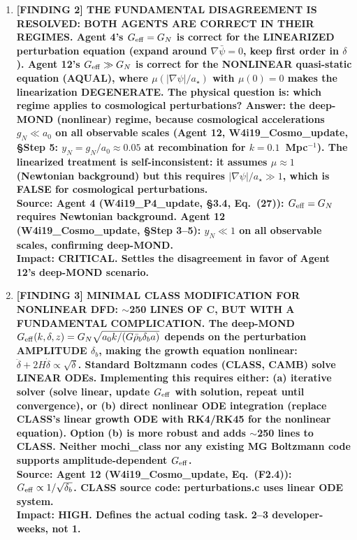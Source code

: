 \documentclass[11pt]{article}
\theoremstyle{definition}
\theoremstyle{remark}
\newcommand{\Geff}{G_{\rm eff}}
\newcommand{\astar}{a_\star}
\begin{document}
\begin{tcolorbox}[colback=blue!5!white, colframe=blue!60!black,
  title=\textbf{W4i20 TOP 5 FINDINGS --- RANKED BY IMPACT}]
\begin{enumerate}[nosep]
\item \textbf{[FINDING 2] THE FUNDAMENTAL DISAGREEMENT IS RESOLVED:
  BOTH AGENTS ARE CORRECT IN THEIR REGIMES.
  Agent 4's $\Geff = G_N$ is correct for the LINEARIZED perturbation
  equation (expand around $\nabla\bar\psi = 0$, keep first order in
  $\delta$). Agent 12's $\Geff \gg G_N$ is correct for the NONLINEAR
  quasi-static equation (AQUAL), where $\mu(|\nabla\psi|/\astar)$ with
  $\mu(0) = 0$ makes the linearization DEGENERATE. The physical question
  is: which regime applies to cosmological perturbations? Answer:
  the deep-MOND (nonlinear) regime, because cosmological accelerations
  $g_N \ll a_0$ on all observable scales (Agent 12, W4i19\_Cosmo\_update,
  \S Step 5: $y_N = g_N/a_0 \approx 0.05$ at recombination for
  $k = 0.1$~Mpc$^{-1}$). The linearized treatment is self-inconsistent:
  it assumes $\mu \approx 1$ (Newtonian background) but this requires
  $|\nabla\psi|/\astar \gg 1$, which is FALSE for cosmological
  perturbations.}\\
  \textbf{Source: Agent 4 (W4i19\_P4\_update, \S3.4, Eq.~(27)):
  $\Geff = G_N$ requires Newtonian background.
  Agent 12 (W4i19\_Cosmo\_update, \S Step 3--5): $y_N \ll 1$ on all
  observable scales, confirming deep-MOND.}\\
  \textbf{Impact: CRITICAL. Settles the disagreement in favor of
  Agent 12's deep-MOND scenario.}

\item \textbf{[FINDING 3] MINIMAL CLASS MODIFICATION FOR NONLINEAR
  DFD: $\sim$250 LINES OF C, BUT WITH A FUNDAMENTAL COMPLICATION.
  The deep-MOND $\Geff(k,\delta,z) = G_N\sqrt{a_0 k/(G\bar\rho_b
  \delta_b a)}$ depends on the perturbation AMPLITUDE $\delta_b$,
  making the growth equation nonlinear: $\ddot\delta + 2H\dot\delta
  \propto \sqrt{\delta}$. Standard Boltzmann codes (CLASS, CAMB)
  solve LINEAR ODEs. Implementing this requires either:
  (a) iterative solver (solve linear, update $\Geff$ with solution,
  repeat until convergence), or (b) direct nonlinear ODE integration
  (replace CLASS's linear growth ODE with RK4/RK45 for the nonlinear
  equation). Option (b) is more robust and adds $\sim$250 lines to
  CLASS. Neither mochi\_class nor any existing MG Boltzmann code
  supports amplitude-dependent $\Geff$.}\\
  \textbf{Source: Agent 12 (W4i19\_Cosmo\_update, Eq.~(F2.4)):
  $\Geff \propto 1/\sqrt{\delta_b}$. CLASS source code:
  perturbations.c uses linear ODE system.}\\
  \textbf{Impact: HIGH. Defines the actual coding task. 2--3
  developer-weeks, not 1.}


\end{enumerate}
\end{tcolorbox}
\end{document}
